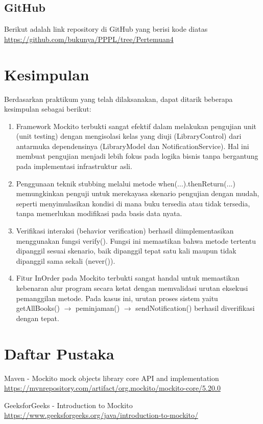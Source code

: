 \documentclass[a4paper,12pt]{article}
\begin{document}
\subsection{GitHub}
Berikut adalah link repository di GitHub yang berisi kode diatas \url{https://github.com/bukunya/PPPL/tree/Pertemuan4}

\section{Kesimpulan}
Berdasarkan praktikum yang telah dilaksanakan, dapat ditarik beberapa kesimpulan sebagai berikut:
\begin{enumerate}
    \item Framework Mockito terbukti sangat efektif dalam melakukan pengujian unit (unit testing) dengan mengisolasi kelas yang diuji (LibraryControl) dari antarmuka dependensinya (LibraryModel dan NotificationService). Hal ini membuat pengujian menjadi lebih fokus pada logika bisnis tanpa bergantung pada implementasi infrastruktur asli.
    \item Penggunaan teknik stubbing melalui metode when(...).thenReturn(...) memungkinkan penguji untuk merekayasa skenario pengujian dengan mudah, seperti menyimulasikan kondisi di mana buku tersedia atau tidak tersedia, tanpa memerlukan modifikasi pada basis data nyata.
    \item Verifikasi interaksi (behavior verification) berhasil diimplementasikan menggunakan fungsi verify(). Fungsi ini memastikan bahwa metode tertentu dipanggil sesuai skenario, baik dipanggil tepat satu kali maupun tidak dipanggil sama sekali (never()).
    \item Fitur InOrder pada Mockito terbukti sangat handal untuk memastikan kebenaran alur program secara ketat dengan memvalidasi urutan eksekusi pemanggilan metode. Pada kasus ini, urutan proses sistem yaitu getAllBooks() $\rightarrow$ peminjaman() $\rightarrow$ sendNotification() berhasil diverifikasi dengan tepat.
\end{enumerate}

\section{Daftar Pustaka}
\begin{enumerate}[label={[\arabic*]}]
    \item Maven - Mockito mock objects library core API and implementation  \url{https://mvnrepository.com/artifact/org.mockito/mockito-core/5.20.0}
    \item GeeksforGeeks - Introduction to Mockito \url{https://www.geeksforgeeks.org/java/introduction-to-mockito/}
\end{enumerate}
\end{document}
